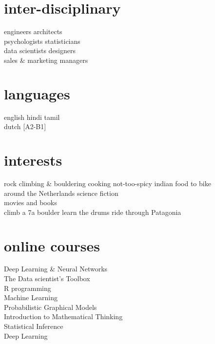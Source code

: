 
\newpage %

\begin{minipage}[t]{0.32\textwidth} %
\section{inter-disciplinary}
engineers \textbullet{} architects\\
psychologists \textbullet{} statisticians\\ data scientists \textbullet{} designers\\ sales \& marketing managers
\sectionspace 

\section{languages}
english \textbullet{} hindi \textbullet{} tamil\\ 
dutch [A2-B1]\\
\sectionspace %
\section{interests}
rock climbing \& bouldering \textbullet{} cooking not-too-spicy indian food \textbullet{} to bike\\ around the Netherlands \textbullet{} science fiction\\ movies and books\\
\sectionspace 
{}
climb a 7a boulder \textbullet{} learn the drums \textbullet{} ride through Patagonia
\sectionspace %

\section{online courses}
Deep Learning \& Neural Networks\\
The Data scientist’s Toolbox\\
R programming\\
Machine Learning\\
Probabilistic Graphical Models\\
Introduction to Mathematical Thinking\\
Statistical Inference\\
Deep Learning\\


\end{minipage} %
